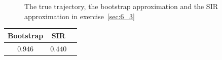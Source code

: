 \documentclass[a4paper,oneside,article]{memoir}
\newcommand{\otoprule}{\midrule[\heavyrulewidth]}
\begin{document}
\begin{figure}[htb]
  \begin{adjustwidth}{-2in}{-2in}
	  \centering
  \end{adjustwidth}
  	  \caption{The true trajectory, the bootstrap approximation and the SIR approximation in exercise~\ref{sec:6_3}}
	  \label{fig:ex_6_3}
\end{figure}


\begin{table}[h]
	\centering
	\begin{tabular}{c c c}
		\otoprule
		Bootstrap & SIR\\
		\midrule
		$0.946$ & $0.440$\\
		\bottomrule
	\end{tabular}
	\label{table:rmse6_3}
\end{table}
\end{document}
